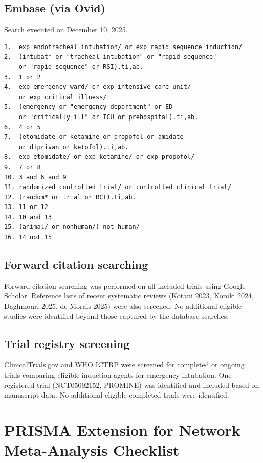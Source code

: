 \documentclass[11pt]{article}
\begin{document}
\subsection{Embase (via Ovid)}

Search executed on December 10, 2025.

\begin{verbatim}
1.  exp endotracheal intubation/ or exp rapid sequence induction/
2.  (intubat* or "tracheal intubation" or "rapid sequence"
    or "rapid-sequence" or RSI).ti,ab.
3.  1 or 2
4.  exp emergency ward/ or exp intensive care unit/
    or exp critical illness/
5.  (emergency or "emergency department" or ED
    or "critically ill" or ICU or prehospital).ti,ab.
6.  4 or 5
7.  (etomidate or ketamine or propofol or amidate
    or diprivan or ketofol).ti,ab.
8.  exp etomidate/ or exp ketamine/ or exp propofol/
9.  7 or 8
10. 3 and 6 and 9
11. randomized controlled trial/ or controlled clinical trial/
12. (random* or trial or RCT).ti,ab.
13. 11 or 12
14. 10 and 13
15. (animal/ or nonhuman/) not human/
16. 14 not 15
\end{verbatim}

\subsection{Forward citation searching}

Forward citation searching was performed on all included trials using Google Scholar. Reference lists of recent systematic reviews (Kotani 2023, Koroki 2024, Daghmouri 2025, de Morais 2025) were also screened. No additional eligible studies were identified beyond those captured by the database searches.

\subsection{Trial registry screening}

ClinicalTrials.gov and WHO ICTRP were screened for completed or ongoing trials comparing eligible induction agents for emergency intubation. One registered trial (NCT05092152, PROMINE) was identified and included based on manuscript data. No additional eligible completed trials were identified.

\newpage

\section{PRISMA Extension for Network Meta-Analysis Checklist}
\label{sec:prisma-nma}
\end{document}
